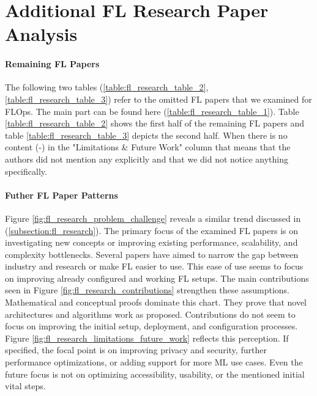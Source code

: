\chapter{Additional FL Research Paper Analysis}\label{appendix:fl_research}

\subsubsection{Remaining FL Papers}

The following two tables (\ref{table:fl_research_table_2}, \ref{table:fl_research_table_3}) refer to the omitted FL papers that we examined for FLOps.
The main part can be found here (\ref{table:fl_research_table_1}).
Table \ref{table:fl_research_table_2} shows the first half of the remaining FL papers and
table \ref{table:fl_research_table_3} depicts the second half.
When there is no content (-) in the "Limitations \& Future Work" column that means that the authors did not mention any explicitly and that we did not notice anything specifically.

\begin{figure}[p]
    
\end{figure}

\begin{figure}[p]
    
\end{figure}


\subsubsection{Futher FL Paper Patterns}

Figure \ref{fig:fl_research_problem_challenge} reveals a similar trend discussed in (\ref{subsection:fl_research}).
The primary focus of the examined FL papers is on investigating new concepts or improving existing performance, scalability, and complexity bottlenecks.
Several papers have aimed to narrow the gap between industry and research or make FL easier to use.
This ease of use seems to focus on improving already configured and working FL setups.
The main contributions seen in Figure \ref{fig:fl_research_contributions} strengthen these assumptions.
Mathematical and conceptual proofs dominate this chart.
They prove that novel architectures and algorithms work as proposed.
Contributions do not seem to focus on improving the initial setup, deployment, and configuration processes.
Figure \ref{fig:fl_research_limitations_future_work} reflects this perception.
If specified, the focal point is on improving privacy and security, further performance optimizations, or adding support for more ML use cases.
Even the future focus is not on optimizing accessibility, usability, or the mentioned initial vital steps.

